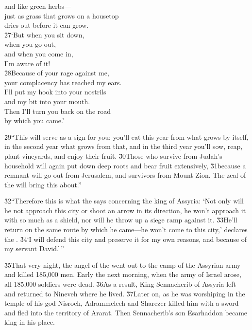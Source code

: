 \begin{poetry}
\poemll    and like green herbs--- \\
\poeml just as grass that grows on a housetop \\
\poemll    dries out before it can grow. \\
\poeml \v{27}`But when you sit down, \\
\poemll    when you go out, \\
\poeml and when you come in, \\
\poemll    I'm aware of it! \\
\poeml \v{28}Because of your rage against me, \\
\poemll    your complacency has reached my ears. \\
\poeml I'll put my hook into your nostrils \\
\poemll    and my bit into your mouth. \\
\poeml Then I'll turn you back on the road \\
\poemll    by which you came.'
\end{poetry}

\v{29}``This will serve as a sign for you: you'll eat this year from what grows by itself, in the second year what grows from that, and in the third year you'll sow, reap, plant vineyards, and enjoy their fruit. \v{30}Those who survive from Judah's household will again put down deep roots and bear fruit extensively, \v{31}because a remnant will go out from Jerusalem, and survivors from Mount Zion. The zeal of the  will bring this about.''

\v{32}``Therefore this is what the  says concerning the king of Assyria: `Not only will he not approach this city or shoot an arrow in its direction, he won't approach it with so much as a shield, nor will he throw up a siege ramp against it. \v{33}He'll return on the same route by which he came---he won't come to this city,' declares the . \v{34}`I will defend this city and preserve it for my own reasons, and because of my servant David.'\,''

\v{35}That very night, the angel of the  went out to the camp of the Assyrian army and killed 185,000 men. Early the next morning, when the army of Israel arose, all 185,000 soldiers were dead. \v{36}As a result, King Sennacherib of Assyria left and returned to Nineveh where he lived. \v{37}Later on, as he was worshiping in the temple of his god Nisroch, Adrammelech and Sharezer killed him with a sword and fled into the territory of Ararat. Then Sennacherib's son Esarhaddon became king in his place.

